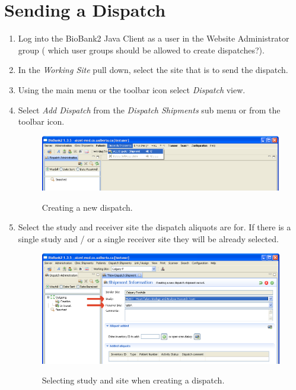 \section{Sending a Dispatch}
\label{sec:dispatch_send}
\begin{enumerate}
  \item Log into the BioBank2 Java Client as a user in the Website
    Administrator group ({\color{red} which user groups should be allowed to
      create dispatches?}).
  \item In the \emph{Working Site} pull down, select the site that is to send the
    dispatch.
  \item Using the main menu or the toolbar icon select \emph{Dispatch} view.
  \item Select \emph{Add Dispatch} from the \emph{Dispatch Shipments} sub menu
    or from the toolbar icon.
    \begin{figure}[H]
      \centering
      \scalebox{0.5}
      { \includegraphics*{screenshots/dispatch_add} }
      \caption{Creating a new dispatch.}
      \label{fig:dispatch_add}
    \end{figure}
  \item Select the study and receiver site the dispatch aliquots are for. If
    there is a single study and / or a single receiver site they will be
    already selected.
    \begin{figure}[H]
      \centering
      \scalebox{0.5}
      { \includegraphics*{screenshots/dispatch_add_entry} }
      \caption{Selecting study and site when creating a dispatch.}
      \label{fig:dispatch_add_entry}
    \end{figure}

\end{enumerate}
